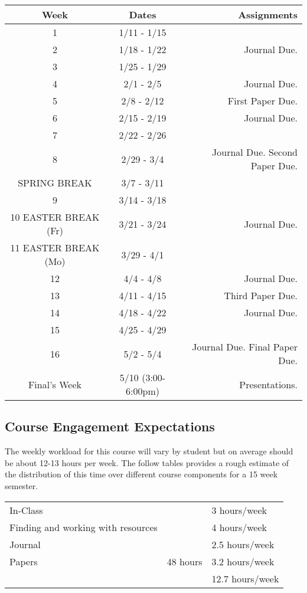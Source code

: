 \documentclass[]{tufte-handout}
\begin{document}
\begin{center}
\begin{tabular}{|c|c|r|}
\hline 
Week & Dates & Assignments \\
\hline
1 & 1/11 - 1/15 &  \\
\hline
2 & 1/18 - 1/22 & Journal Due. \\
\hline
3 & 1/25 - 1/29 &   \\
\hline
4 & 2/1 - 2/5 & Journal Due.  \\
\hline
5 & 2/8 - 2/12 &  First Paper Due.\\
\hline
6 & 2/15 - 2/19 & Journal Due. \\
\hline
7 & 2/22 - 2/26 &   \\
\hline
8 & 2/29 - 3/4 & Journal Due. Second Paper Due.  \\
\hline 
SPRING BREAK & 3/7 - 3/11 &  \\
\hline
9 & 3/14 - 3/18 &  \\
\hline
10 EASTER BREAK (Fr)& 3/21 - 3/24 & Journal Due. \\
\hline
11 EASTER BREAK (Mo)& 3/29 - 4/1 &  \\
\hline
12 & 4/4 - 4/8 & Journal Due. \\
\hline
13 & 4/11 - 4/15 &   Third Paper Due.\\
\hline
14 & 4/18 - 4/22 &  Journal Due. \\
\hline
15 & 4/25 - 4/29 &  \\ 
\hline
16 & 5/2 - 5/4 & Journal Due. Final Paper Due.\\
\hline
Final's Week & 5/10 (3:00-6:00pm) & Presentations. \\ 
\hline
\end{tabular}
\end{center}

\subsection{Course Engagement Expectations}

The weekly workload for this course will vary by student but on average should be about 12-13 hours per week.  The follow tables provides a rough estimate of the distribution of this time over different course components for a 15 week semester. 
\begin{center}
\begin{tabular}{|l|l|l|}
\hline
In-Class &      & 3 hours/week \\ 
Finding and working with resources &        & 4 hours/week \\
Journal &   & 2.5 hours/week \\ 
Papers & 48 hours & 3.2 hours/week \\
\hline 
& & 12.7 hours/week \\ 
\hline
\end{tabular}
\end{center}

    
\end{document}

